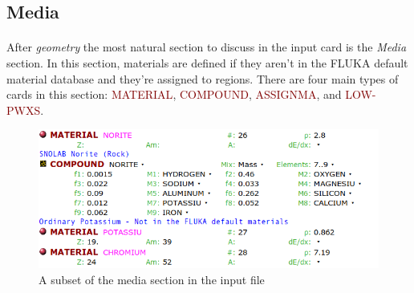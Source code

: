 
\subsection{Media}
\label{sec:Media}
\paragraph{}
After \textit{geometry} the most natural section to discuss in the input card is the \textit{Media} section. In this section, materials are defined if they aren't in the FLUKA default material database and they're assigned to regions. There are four main types of cards in this section: \textcolor{Maroon}{MATERIAL}, \textcolor{Maroon}{COMPOUND}, \textcolor{Maroon}{ASSIGNMA}, and \textcolor{Maroon}{LOW-PWXS}. 

\begin{figure}[h]
    \begin{center}
    \includegraphics[scale=0.5]{figures/media_1.png}
    \caption{A subset of the media section in the input file}
    \label{fig:media1}
    \end{center}
\end{figure}


